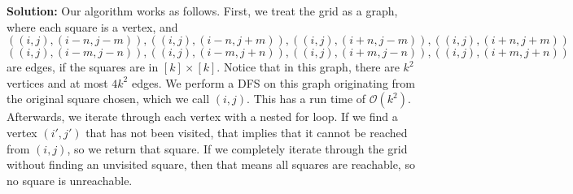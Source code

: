 \documentclass{assignment-263}
\begin{document}
 \textbf{Solution:} Our algorithm works as follows. First, we treat the grid as a graph, where each square is a vertex, and
 \[
  ((i,j), (i - n, j - m)),((i,j), (i - n, j + m)),((i,j), (i + n, j - m)),((i,j), (i + n, j + m))
 \]
 \[
  ((i,j), (i - m, j - n)),((i,j), (i - m, j + n)),((i,j), (i + m, j - n)),((i,j), (i + m, j + n))
 \]
 are edges, if the squares are in \([k]\times [k]\). Notice that in this graph, there are \(k^2\) vertices and at most \(4k^2\) edges. We perform a DFS on this graph originating from the original square chosen, which we call \((i,j)\). This has a run time of \(\mathcal{O} (k^2)\). Afterwards, we iterate through each vertex with a nested for loop. If we find a vertex \((i', j')\) that has not been visited, that implies that it cannot be reached from \((i,j)\), so we return that square. If we completely iterate through the grid without finding an unvisited square, then that means all squares are reachable, so no square is unreachable.

\program
\end{document}
